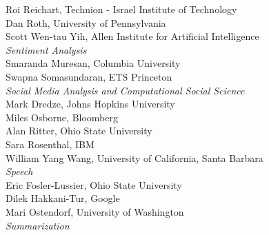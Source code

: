                                     \hspace*{0.2in} Roi Reichart, Technion - Israel Institute of Technology \\
                                    \hspace*{0.2in} Dan Roth, University of Pennsylvania \\
                                    \hspace*{0.2in} Scott Wen-tau Yih, Allen Institute for Artificial Intelligence \\
                            \emph{Sentiment Analysis} \\
                                    \hspace*{0.2in} Smaranda Muresan, Columbia University \\
                                    \hspace*{0.2in} Swapna Somasundaran, ETS Princeton \\
                            \emph{Social Media Analysis and Computational Social Science} \\
                                    \hspace*{0.2in} Mark Dredze, Johns Hopkins University \\
                                    \hspace*{0.2in} Miles Osborne, Bloomberg \\
                                    \hspace*{0.2in} Alan Ritter, Ohio State University \\
                                    \hspace*{0.2in} Sara Rosenthal, IBM \\
                                    \hspace*{0.2in} William Yang Wang, University of California, Santa Barbara \\
                            \emph{Speech} \\
                                    \hspace*{0.2in} Eric Fosler-Lussier, Ohio State University \\
                                    \hspace*{0.2in} Dilek Hakkani-Tur, Google \\
                                    \hspace*{0.2in} Mari Ostendorf, University of Washington \\
                            \emph{Summarization} \\
